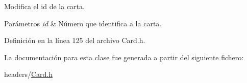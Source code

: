 Modifica el id de la carta. 


\begin{DoxyParams}{Parámetros}
{\em id} & Número que identifica a la carta. \\
\hline
\end{DoxyParams}


Definición en la línea 125 del archivo Card.\-h.



La documentación para esta clase fue generada a partir del siguiente fichero\-:\begin{DoxyCompactItemize}
\item 
headers/\hyperlink{Card_8h}{Card.\-h}\end{DoxyCompactItemize}
